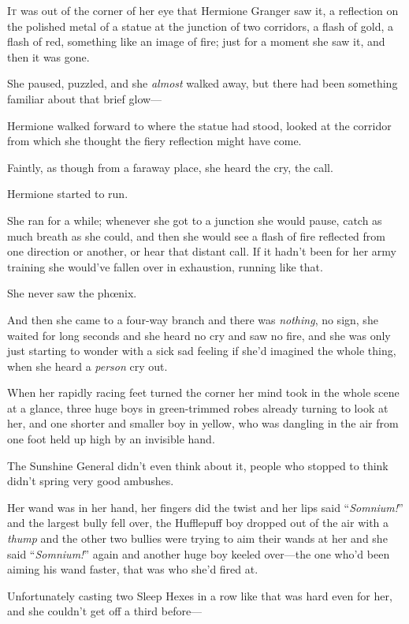 
\lettrine{I}{t} was out of the corner of her eye that Hermione Granger saw it, a reflection on the polished metal of a statue at the junction of two corridors, a flash of gold, a flash of red, something like an image of fire; just for a moment she saw it, and then it was gone.

She paused, puzzled, and she \emph{almost} walked away, but there had been something familiar about that brief glow—

Hermione walked forward to where the statue had stood, looked at the corridor from which she thought the fiery reflection might have come.

Faintly, as though from a faraway place, she heard the cry, the call.

Hermione started to run.

She ran for a while; whenever she got to a junction she would pause, catch as much breath as she could, and then she would see a flash of fire reflected from one direction or another, or hear that distant call. If it hadn’t been for her army training she would’ve fallen over in exhaustion, running like that.

She never saw the phœnix.

And then she came to a four-way branch and there was \emph{nothing}, no sign, she waited for long seconds and she heard no cry and saw no fire, and she was only just starting to wonder with a sick sad feeling if she’d imagined the whole thing, when she heard a \emph{person} cry out.

When her rapidly racing feet turned the corner her mind took in the whole scene at a glance, three huge boys in green-trimmed robes already turning to look at her, and one shorter and smaller boy in yellow, who was dangling in the air from one foot held up high by an invisible hand.

The Sunshine General didn’t even think about it, people who stopped to think didn’t spring very good ambushes.

Her wand was in her hand, her fingers did the twist and her lips said “\emph{Somnium!}” and the largest bully fell over, the Hufflepuff boy dropped out of the air with a \emph{thump} and the other two bullies were trying to aim their wands at her and she said “\emph{Somnium!}” again and another huge boy keeled over—the one who’d been aiming his wand faster, that was who she’d fired at.

Unfortunately casting two Sleep Hexes in a row like that was hard even for her, and she couldn’t get off a third before—


